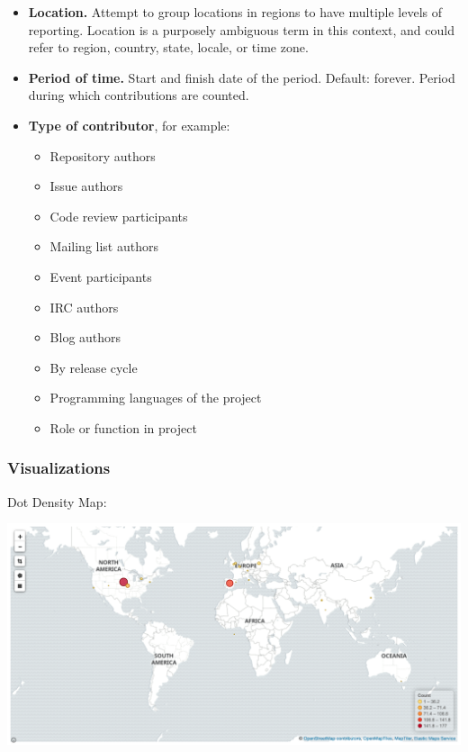 \begin{itemize}
\tightlist
\item
  \textbf{Location.} Attempt to group locations in regions to have
  multiple levels of reporting. Location is a purposely ambiguous term
  in this context, and could refer to region, country, state, locale, or
  time zone.
\item
  \textbf{Period of time.} Start and finish date of the period. Default:
  forever. Period during which contributions are counted.
\item
  \textbf{Type of contributor}, for example:

  \begin{itemize}
  \tightlist
  \item
    Repository authors
  \item
    Issue authors
  \item
    Code review participants
  \item
    Mailing list authors
  \item
    Event participants
  \item
    IRC authors
  \item
    Blog authors
  \item
    By release cycle
  \item
    Programming languages of the project
  \item
    Role or function in project
  \end{itemize}
\end{itemize}

\hypertarget{visualizations}{%
\subsubsection{Visualizations}\label{visualizations}}

Dot Density Map:

\includegraphics{images/contributor-location_dot-density-map.png}

